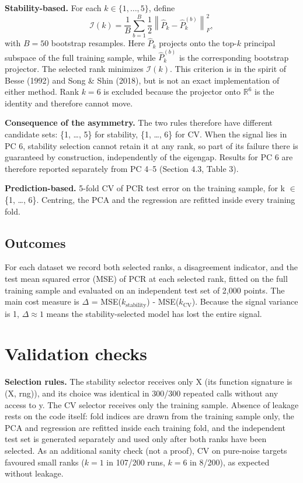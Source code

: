 \documentclass[11pt]{article}
\begin{document}
\textbf{Stability-based.} For each $k\in\{1,\ldots,5\}$, define
\begin{equation}
\mathcal I(k)=\frac{1}{B}\sum_{b=1}^{B}\frac{1}{2}\left\lVert\widehat P_k-\widehat P_k^{(b)}\right\rVert_F^2,
\end{equation}
with $B=50$ bootstrap resamples. Here $\widehat P_k$ projects onto the top-$k$ principal subspace of the full training sample, while $\widehat P_k^{(b)}$ is the corresponding bootstrap projector. The selected rank minimizes $\mathcal I(k)$. This criterion is in the spirit of Besse (1992) and Song \& Shin (2018), but is not an exact implementation of either method. Rank $k=6$ is excluded because the projector onto $\mathbb R^6$ is the identity and therefore cannot move.

\textbf{Consequence of the asymmetry.} The two rules therefore have different candidate sets: \{1, \ldots{}, 5\} for stability, \{1, \ldots{}, 6\} for CV. When the signal lies in PC 6, stability selection cannot retain it at any rank, so part of its failure there is guaranteed by construction, independently of the eigengap. Results for PC 6 are therefore reported separately from PC 4--5 (Section 4.3, Table 3).\par

\textbf{Prediction-based.} 5-fold CV of PCR test error on the training sample, for k $\in$ \{1, \ldots{}, 6\}. Centring, the PCA and the regression are refitted inside every training fold.\par

\subsection{Outcomes}

For each dataset we record both selected ranks, a disagreement indicator, and the test mean squared error (MSE) of PCR at each selected rank, fitted on the full training sample and evaluated on an independent test set of 2,000 points. The main cost measure is $\Delta$ = MSE($k_{\mathrm{stability}}$) - MSE($k_{\mathrm{CV}}$). Because the signal variance is 1, $\Delta\approx 1$ means the stability-selected model has lost the entire signal.\par

\section{Validation checks}

\textbf{Selection rules.} The stability selector receives only X (its function signature is (X, rng)), and its choice was identical in 300/300 repeated calls without any access to y. The CV selector receives only the training sample. Absence of leakage rests on the code itself: fold indices are drawn from the training sample only, the PCA and regression are refitted inside each training fold, and the independent test set is generated separately and used only after both ranks have been selected. As an additional sanity check (not a proof), CV on pure-noise targets favoured small ranks ($k=1$ in 107/200 runs, $k=6$ in 8/200), as expected without leakage.\par
\end{document}
